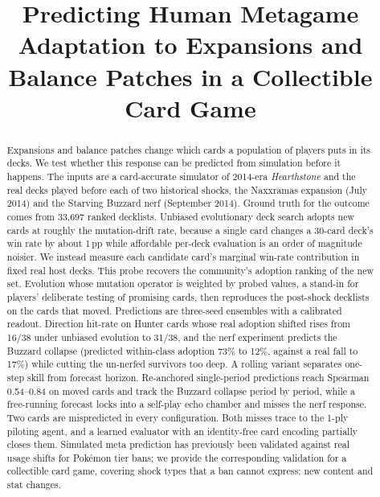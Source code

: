 \documentclass[conference]{IEEEtran}
\newcommand{\pp}{\,\text{pp}}
\begin{document}
\title{Predicting Human Metagame Adaptation to Expansions and Balance
Patches in a Collectible Card Game}

\author{
}

\maketitle

\begin{abstract}
Expansions and balance patches change which cards a population of
players puts in its decks. We test whether this response can be
predicted from simulation before it happens. The inputs are a
card-accurate simulator of 2014-era \emph{Hearthstone} and the real
decks played before each of two historical shocks, the Naxxramas
expansion (July 2014) and the Starving Buzzard nerf (September 2014).
Ground truth for the outcome comes from 33{,}697 ranked decklists.
Unbiased evolutionary deck search adopts new cards at roughly the
mutation-drift rate, because a single card changes a 30-card deck's
win rate by about 1$\pp$ while affordable per-deck evaluation is an
order of magnitude noisier. We instead measure each candidate card's
marginal win-rate contribution in fixed real host decks. This probe
recovers the community's adoption ranking of the new set. Evolution
whose mutation operator is weighted by probed values, a stand-in for
players' deliberate testing of promising cards, then reproduces the
post-shock decklists on the cards that moved. Predictions are
three-seed ensembles with a calibrated readout. Direction hit-rate on
Hunter cards whose real adoption shifted rises from 16/38 under
unbiased evolution to 31/38, and the nerf experiment predicts the
Buzzard collapse (predicted within-class adoption 73\% to 12\%,
against a real fall to 17\%) while cutting the un-nerfed survivors
too deep. A rolling variant separates one-step skill from forecast
horizon. Re-anchored single-period predictions reach Spearman
0.54--0.84 on moved cards and track the Buzzard collapse period by
period, while a free-running forecast locks into a self-play echo
chamber and misses the nerf response. Two cards are mispredicted in
every configuration. Both misses trace to the 1-ply piloting agent,
and a learned evaluator with an identity-free card encoding
partially closes them. Simulated meta
prediction has previously been validated against real usage shifts
for Pok\'emon tier bans; we provide the corresponding validation for
a collectible card game, covering shock types that a ban cannot
express: new content and stat changes.
\end{abstract}
\end{document}
